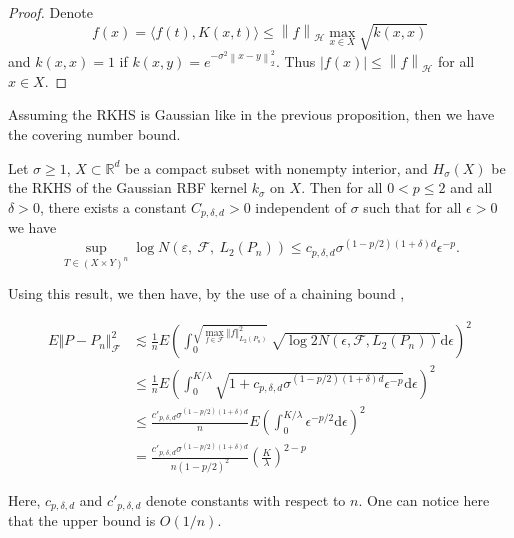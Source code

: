 	\begin{proof}
		Denote $$f(x)=\langle f(t),K(x,t)\rangle \leq \left\|f\right\|_{\mathcal{H}}\max_{x\in X} \sqrt{k(x,x)}$$ and $k(x,x)=1$ if $k(x,y)=e^{-\sigma^2 \left\|x-y\right\|_2^2}$. Thus $\left|f(x)\right|\leq \left\|f\right\|_{\mathcal{H}}$ for all $x\in X$.
	\end{proof}
	
	Assuming the RKHS is Gaussian like in the previous proposition, then we have the covering number bound.
	\begin{theorem} \cite{Steinwart2007}
		Let $\sigma\geq 1$, $X\subset \mathbb{R}^d$ be a compact subset with nonempty interior, and $H_{\sigma}(X)$ be the RKHS of the Gaussian RBF kernel $k_{\sigma}$ on $X$. Then for all $0<p\leq 2$ and all $\delta>0$, there exists a constant $C_{p,\delta,d}>0$ independent of $\sigma$ such that for all $\epsilon>0$ we have 
		$$
		\sup_{T\in (X\times Y)^n} \log N(\varepsilon,\ \mathcal{F},\ L_{2}(P_{n}))\leq c_{p,\delta,d} \sigma^{(1-p/2)(1+\delta)d}\epsilon^{-p}.
		$$
	\end{theorem}
	
	Using this result, we then have, by the use of a chaining bound \cite{Gine2016},
	
	\begin{align*}
		E \displaystyle\Vert P-P_n\Vert_{\mathcal{F}}^{2}&\lesssim \frac{1}{n}E(\int_{0}^{\sqrt{\max_{f\in \mathcal{F}}\Vert f\Vert_{L_{2}(P_{n})}^{2}}}\sqrt{\log 2N(\epsilon,\mathcal{F},L_{2}(P_{n}))}\mathrm{d}\epsilon)^{2} \\
		&\leq \frac{1}{n}E(\int_{0}^{K/\lambda}\sqrt{1+c_{p,\delta,d} \sigma^{(1-p/2)(1+\delta)d}\epsilon^{-p}}\mathrm{d}\epsilon)^{2} \\
		&\leq \frac{c'_{p,\delta,d} \sigma^{(1-p/2)(1+\delta)d}}{n}E(\int_{0}^{K/\lambda} \epsilon^{-p/2} \mathrm{d}\epsilon)^{2} \\
		&= \frac{c'_{p,\delta,d} \sigma^{(1-p/2)(1+\delta)d}}{n(1-p/2)^2} \left(\frac{K}{\lambda}\right)^{2-p}
	\end{align*}
	
	Here, $c_{p,\delta,d}$ and $c'_{p,\delta,d}$ denote constants with respect to $n$. One can notice here that the upper bound is $O(1/n)$.
